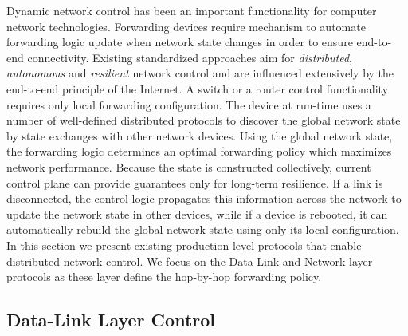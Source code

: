 % 

Dynamic network control has been an important functionality for computer network
technologies. Forwarding devices require mechanism to automate forwarding logic
update when network state changes in order to ensure end-to-end connectivity.
Existing standardized approaches aim for {\it distributed}, {\it autonomous} and
{\it resilient} network control and are influenced extensively by the end-to-end
principle of the Internet. A switch or a router control functionality requires
only local forwarding configuration.  The device at run-time uses a number of
well-defined distributed protocols to discover the global network state by state
exchanges with other network devices.  Using the global network state, the
forwarding logic determines an optimal forwarding policy which maximizes network
performance. Because the state is constructed collectively, current control
plane can provide guarantees only for long-term resilience. If a link is
disconnected, the control logic propagates this information across the network
to update the network state in other devices, while if a device is rebooted, it
can automatically rebuild the global network state using only its local
configuration.  In this section we present existing production-level protocols
that enable distributed network control. We focus on the Data-Link and Network
layer protocols as these layer define the hop-by-hop forwarding policy.

\subsection{Data-Link Layer Control}

